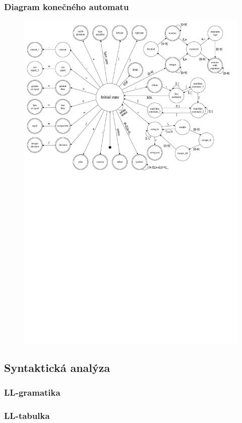 \documentclass[11pt,a4paper]{article}
\begin{document}
        \subsubsection{Diagram konečného automatu}
        \begin{figure}
            \centering
            \includegraphics[scale=0.37]{images/FSM.pdf}
        \end{figure}
    \subsection{Syntaktická analýza}
        \subsubsection{LL-gramatika}
        \subsubsection{LL-tabulka}
\end{document}
